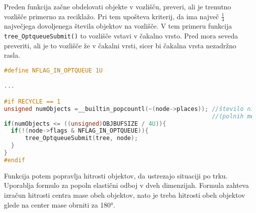 \documentclass[a4paper,12pt]{article}
\begin{document}
Preden funkcija začne obdelovati objekte v vozlišču, preveri, ali je trenutno vozlišče primerno za reciklažo.
Pri tem upošteva kriterij, da ima največ {\small$ \frac{1}{4}$} največjega dovoljenega števila objektov na vozlišče.
V tem primeru funkcija \lstinline{tree_OptqueueSubmit()} to vozlišče vstavi v čakalno vrsto.
Pred mora seveda preveriti, ali je to vozlišče že v čakalni vrsti, sicer bi čakalna vrsta nezadržno rasla.
\begin{lstlisting}[caption={\lstinline|vector_update()| -- Reciklaža}, label=vectorupdate2, language=C]
#define NFLAG_IN_OPTQUEUE 1U

...

#if RECYCLE == 1
unsigned numObjects =__builtin_popcountl(~(node->places)); //število ničel
                                                           //(polnih mest)
if(numObjects <= ((unsigned)OBJBUFSIZE / 4U)){
  if(!(node->flags & NFLAG_IN_OPTQUEUE)){
      tree_OptqueueSubmit(tree, node);
  }
}
#endif
\end{lstlisting}
Funkcija potem popravlja hitrosti objektov, da ustrezajo situaciji po trku. Uporablja formulo za popoln elastični odboj
v dveh dimenzijah. Formula zahteva izračun hitrosti centra mase obeh objektov, nato je treba hitrosti obeh objektov
glede na center mase obrniti za 180°.
\end{document}
